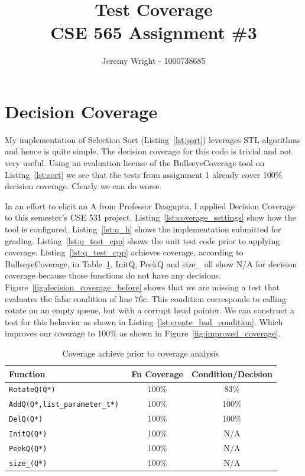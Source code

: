 \documentclass[12pt,journal]{article}
\begin{document}
\doublespace
\title{Test Coverage\\ CSE 565 Assignment \#3}
\author{Jeremy Wright - 1000738685}

\maketitle

\section{Decision Coverage}

My implementation of Selection Sort (Listing~\ref{lst:sort}) leverages STL algorithms and hence is quite
simple. The decision coverage for this code is trivial and not very useful.
Using an evaluation license of the BullseyeCoverage tool on
Listing~\ref{lst:sort} we see that the tests from assignment 1 already cover
100\% decision coverage. Clearly we can do worse.

In an effort to elicit an A from Professor Dasgupta, I applied Decision
Coverage to this semester's CSE 531 project. 
Listing~\ref{lst:coverage_settings} show how the tool is configured. 
Listing~\ref{lst:q_h} shows the implementation submitted for grading.
Listing~\ref{lst:q_test_cpp} shows the unit test code prior to applying
coverage. Listing~\ref{lst:q_test_cpp} achieves coverage, according to
BullseyeCoverage, in Table~\ref{tab:before_coverage}. InitQ, PeekQ and size\_
all show N/A for decision coverage because those functions do not have any
decisions. Figure~\ref{fig:decision_coverage_before} shows that we are missing
a test that evaluates the false condition of line 76c. This condition
corresponds to calling rotate on an empty queue, but with a corrupt head
pointer. We can construct a test for this behavior as shown in
Listing~\ref{lst:create_bad_condition}. Which improves our coverage to 100\% as
shown in Figure~\ref{fig:improved_coverage}.

\begin{table}
    \centering
    \caption{Coverage achieve prior to coverage analysis}
    \label{tab:before_coverage}
    \begin{tabular}{ l | c | c}
        \hline
        Function & Fn Coverage & Condition/Decision  \\
        \hline \hline 
        \tt{RotateQ(Q*)}	& 100\%	 & 83\%	 \\
        \tt{AddQ(Q*,list\_parameter\_t*)} &	100\% & 100\%	\\
        \tt{DelQ(Q*)}	& 100\% & 100\% \\	
        \tt{InitQ(Q*)}	& 100\% & N/A \\	
        \tt{PeekQ(Q*)}	& 100\% & N/A \\	
        \tt{size\_(Q*)}	& 100\% & N/A \\	
        \hline
    \end{tabular}
\end{table}
\end{document}
